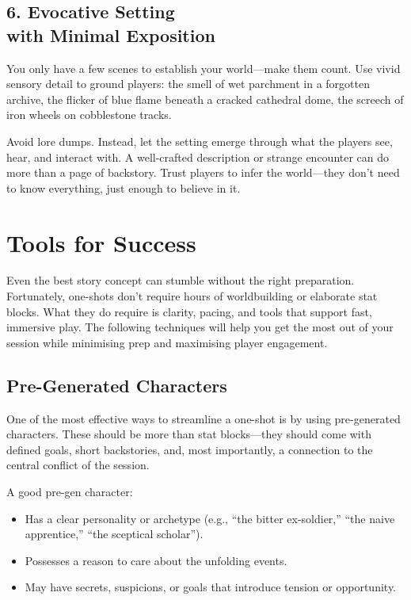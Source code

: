 \subsection*{6. Evocative Setting\\ with Minimal Exposition}

You only have a few scenes to establish your world—make them count. Use vivid sensory detail to ground players: the smell of wet parchment in a forgotten archive, the flicker of blue flame beneath a cracked cathedral dome, the screech of iron wheels on cobblestone tracks.

Avoid lore dumps. Instead, let the setting emerge through what the players see, hear, and interact with. A well-crafted description or strange encounter can do more than a page of backstory. Trust players to infer the world—they don’t need to know everything, just enough to believe in it.





\section{Tools for Success}

Even the best story concept can stumble without the right preparation. Fortunately, one-shots don’t require hours of worldbuilding or elaborate stat blocks. What they do require is clarity, pacing, and tools that support fast, immersive play. The following techniques will help you get the most out of your session while minimising prep and maximising player engagement.

\subsection*{Pre-Generated Characters}

One of the most effective ways to streamline a one-shot is by using pre-generated characters. These should be more than stat blocks—they should come with defined goals, short backstories, and, most importantly, a connection to the central conflict of the session.

A good pre-gen character:
\begin{itemize}
    \item Has a clear personality or archetype (e.g., “the bitter ex-soldier,” “the naive apprentice,” “the sceptical scholar”).
    \item Possesses a reason to care about the unfolding events.
    \item May have secrets, suspicions, or goals that introduce tension or opportunity.
\end{itemize}


